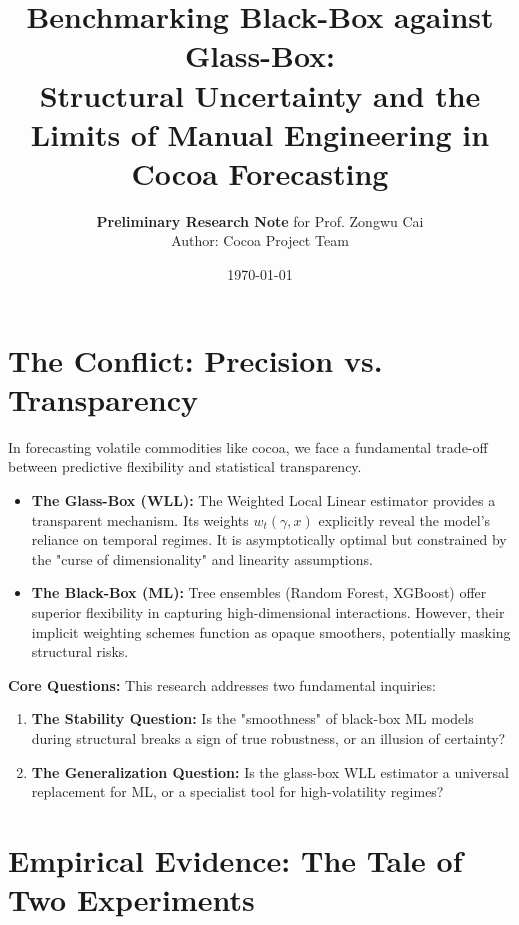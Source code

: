 \documentclass[11pt, a4paper]{article}
\title{\vspace{-2cm}\textbf{Benchmarking Black-Box against Glass-Box:}\\ \large Structural Uncertainty and the Limits of Manual Engineering in Cocoa Forecasting}
\author{\textbf{Preliminary Research Note} for Prof. Zongwu Cai \\ Author: Cocoa Project Team}
\date{\today}
\begin{document}
\maketitle

\section{The Conflict: Precision vs. Transparency}

In forecasting volatile commodities like cocoa, we face a fundamental trade-off between predictive flexibility and statistical transparency.
\begin{itemize}[leftmargin=*]
    \item \textbf{The Glass-Box (WLL):} The Weighted Local Linear estimator provides a transparent mechanism. Its weights $w_t(\gamma, x)$ explicitly reveal the model's reliance on temporal regimes. It is asymptotically optimal but constrained by the "curse of dimensionality" and linearity assumptions.
    \item \textbf{The Black-Box (ML):} Tree ensembles (Random Forest, XGBoost) offer superior flexibility in capturing high-dimensional interactions. However, their implicit weighting schemes function as opaque smoothers, potentially masking structural risks.
\end{itemize}

\noindent \textbf{Core Questions:} This research addresses two fundamental inquiries:
\begin{enumerate}[leftmargin=*]
    \item \textbf{The Stability Question:} Is the "smoothness" of black-box ML models during structural breaks a sign of true robustness, or an illusion of certainty?
    \item \textbf{The Generalization Question:} Is the glass-box WLL estimator a universal replacement for ML, or a specialist tool for high-volatility regimes?
\end{enumerate}

\section{Empirical Evidence: The Tale of Two Experiments}
\end{document}
